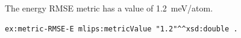 The energy RMSE metric has a value of 1.2~meV/atom.
\begin{lstlisting}[language=turtle]
ex:metric-RMSE-E mlips:metricValue "1.2"^^xsd:double .
\end{lstlisting}
